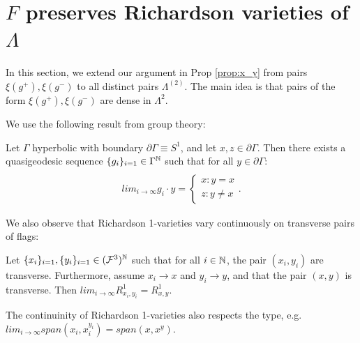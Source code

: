 \section{$F$ preserves Richardson varieties of $\Lambda$}

In this section, we extend our argument in Prop \ref{prop:x_y} from pairs 
$\xi(g^+), \xi(g^-)$ to all distinct pairs $\Lambda^{(2)}$.
The main idea is that pairs of the form $\xi(g^+),\xi(g^-)$ are dense in $\Lambda^2$.

We use the following result from group theory:
\begin{fact}\label{fact:qgeo}
    Let $\Gamma$ hyperbolic with boundary $\partial \Gamma \equiv S^1$, 
    and let $x,z \in \partial \Gamma$. 
    Then there exists a quasigeodesic sequence $\{g_i\}_{i=1} \in \Gamma^{\mathbb{N}}$ 
    such that for all $y \in \partial \Gamma$:  
    \begin{align}
        \\lim_{i \rightarrow \infty} g_i \cdot y = 
        \begin{cases}
            x : y = x\\
            z : y \neq x
        \end{cases}.
    \end{align}
\end{fact}

We also observe that Richardson 1-varieties vary continuously on transverse pairs of flags:
\begin{remark}\label{rmk:continuous}
    Let $\{x_i\}_{i=1}, \{y_i\}_{i=1} \in (\mathcal{F}^3)^{\mathbb{N}}$ such that 
    for all $i \in \mathbb{N}$, the pair $(x_i,y_i)$ are transverse.
    Furthermore, assume $x_i \rightarrow x$ and $y_i \rightarrow y$, 
    and that the pair $(x,y)$ is transverse.
    Then $lim_{i \rightarrow \infty} R^1_{x_i,y_i} = R^1_{x,y}$.
\end{remark}
The continuinity of Richardson 1-varieties also respects the type,
e.g. $lim_{i \rightarrow \infty} span(x_i, x_i^{y_i}) = span(x,x^y)$.

